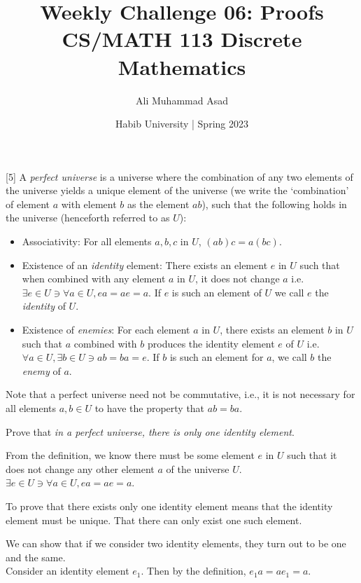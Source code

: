 \documentclass[a4paper]{exam}
\title{Weekly Challenge 06: Proofs\\CS/MATH 113 Discrete Mathematics}
\author{Ali Muhammad Asad}  %
\date{Habib University | Spring 2023}
\begin{document}
\maketitle

\begin{questions}

  [5] A \textit{perfect universe} is a universe where the combination of any two elements of the universe yields a unique element of the universe (we write the `combination' of element $a$ with element $b$ as the element $ab$), such that the following holds in the universe (henceforth referred to as $U$): 
  \begin{itemize}
  \item Associativity: For all elements $a, b, c$ in $U$, $(ab)c = a(bc)$. 
  \item Existence of an \textit{identity} element: There exists an element $e$ in $U$ such that when combined with any element $a$ in $U$, it does not change $a$ i.e. $\exists e \in U \ni \forall a \in U, ea=ae=a$. If $e$ is such an element of $U$ we call $e$ the \textit{identity} of $U$.
  \item Existence of \textit{enemies}: For each element $a$ in $U$, there exists an element $b$ in $U$ such that $a$ combined with $b$ produces the identity element $e$ of $U$ i.e. $\forall a \in U, \exists b \in U \ni ab= ba = e$. If $b$ is such an element for $a$, we call $b$ the \textit{enemy} of $a$.
  \end{itemize}
  Note that a perfect universe need not be commutative, i.e., it is not necessary for all elements $a, b\in U$ to have the property that $ab=ba$.
  
  \begin{parts}
  \item Prove that \textit{in a perfect universe, there is only one identity element}.
    \begin{solution}
      From the definition, we know there must be some element $e$ in $U$ such that it does not change any other element $a$ of the universe $U$. $ \exists e \in U \ni \forall a \in U, ea = ae = a $. 

      To prove that there exists only one identity element means that the identity element must be unique. That there can only exist one such element. 

      We can show that if we consider two identity elements, they turn out to be one and the same. \\ 
      Consider an identity element $e_1$. Then by the definition, $ e_1a = ae_1 = a $.


\end{solution}
\end{parts}
\end{questions}
\end{document}

